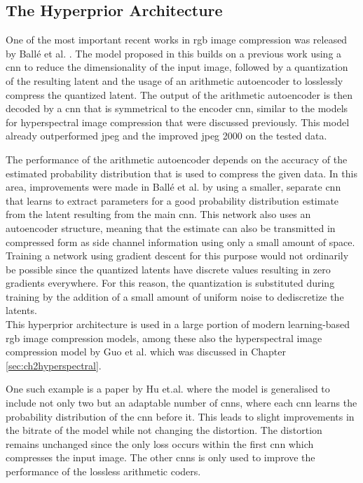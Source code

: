 \subsection{The Hyperprior Architecture}
One of the most important recent works in \ac{rgb} image compression was released by Ballé et al. \citep{balle_variational_2018}. The model proposed in this builds on a previous work \citep{balle_end--end_2017} using a \ac{cnn} to reduce the dimensionality of the input image, followed by a quantization of the resulting latent and the usage of an arithmetic autoencoder to losslessly compress the quantized latent. The output of the arithmetic autoencoder is then decoded by a \ac{cnn} that is symmetrical to the encoder \ac{cnn}, similar to the models for hyperspectral image compression that were discussed previously. This model already outperformed \ac{jpeg} and the improved \ac{jpeg} 2000 on the tested data.

The performance of the arithmetic autoencoder depends on the accuracy of the estimated probability distribution that is used to compress the given data. In this area, improvements were made in Ballé et al. \citep{balle_variational_2018} by using a smaller, separate \ac{cnn} that learns to extract parameters for a good probability distribution estimate from the latent resulting from the main \ac{cnn}. This network also uses an autoencoder structure, meaning that the estimate can also be transmitted in compressed form as side channel information using only a small amount of space. Training a network using gradient descent for this purpose would not ordinarily be possible since the quantized latents have discrete values resulting in zero gradients everywhere. For this reason, the quantization is substituted during training by the addition of a small amount of uniform noise to dediscretize the latents.\\
This hyperprior architecture is used in a large portion of modern learning-based \ac{rgb} image compression models, among these also the hyperspectral image compression model by Guo et al. \citep{guo_learned_2021} which was discussed in Chapter \ref{sec:ch2hyperspectral}.

One such example is a paper by Hu et.al. \citep{hu_coarse--fine_2020} where the model is generalised to include not only two but an adaptable number of \acp{cnn}, where each \ac{cnn} learns the probability distribution of the \ac{cnn} before it. This leads to slight improvements in the bitrate of the model while not changing the distortion. The distortion remains unchanged since the only loss occurs within the first \ac{cnn} which compresses the input image. The other \acp{cnn} is only used to improve the performance of the lossless arithmetic coders.

